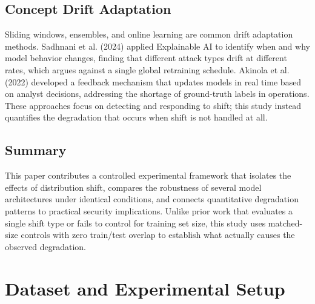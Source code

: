 \documentclass[10pt]{article}
\begin{document}
\subsection{Concept Drift Adaptation}
Sliding windows, ensembles, and online learning are common drift adaptation methods. Sadhnani et al. (2024) applied Explainable AI to identify when and why model behavior changes, finding that different attack types drift at different rates, which argues against a single global retraining schedule. Akinola et al. (2022) developed a feedback mechanism that updates models in real time based on analyst decisions, addressing the shortage of ground-truth labels in operations. These approaches focus on detecting and responding to shift; this study instead quantifies the degradation that occurs when shift is not handled at all.
\subsection{Summary}
This paper contributes a controlled experimental framework that isolates the effects of distribution shift, compares the robustness of several model architectures under identical conditions, and connects quantitative degradation patterns to practical security implications. Unlike prior work that evaluates a single shift type or fails to control for training set size, this study uses matched-size controls with zero train/test overlap to establish what actually causes the observed degradation.
\section{Dataset and Experimental Setup}
\end{document}
